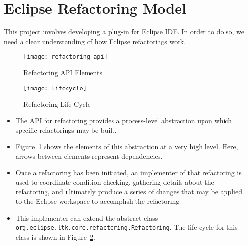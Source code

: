 \section{Eclipse Refactoring Model}

This project involves developing a plug-in for Eclipse IDE\@. In order to do
so, we need a clear understanding of how Eclipse refactorings work. 

\begin{figure}
    \centering
    \texttt{[image: refactoring\_api]}
    \caption{Refactoring API Elements}
\label{fig:refact_api}
\end{figure}

\begin{figure}
    \centering
    \texttt{[image: lifecycle]}
    \caption{Refactoring Life-Cycle}
\label{fig:lifecycle}
\end{figure}

\begin{itemize}   

 \item The API for refactoring provides a process-level abstraction upon which
     specific refactorings may be built. 

 \item Figure~\ref{fig:refact_api} shows the elements of this abstraction at a
     very high level.  Here, arrows between elements represent dependencies.

 \item Once a refactoring has been initiated, an implementer of that
     refactoring is used to coordinate condition checking, gathering details
     about the refactoring, and ultimately produce a series of changes that
     may be applied to the Eclipse workspace to accomplish the refactoring. 

 \item This implementer can extend the abstract class\\
     \lstinline{org.eclipse.ltk.core.refactoring.Refactoring}. The life-cycle
     for this class is shown in Figure~\ref{fig:lifecycle}. 


\end{itemize}
